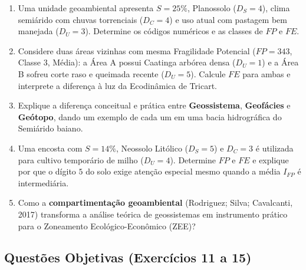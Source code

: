 \begin{enumerate}[leftmargin=1.8em, itemsep=4pt, resume]
  \item Uma unidade geoambiental apresenta $S = 25\%$, Planossolo ($D_S = 4$), clima semiárido com chuvas torrenciais ($D_C = 4$) e uso atual com pastagem bem manejada ($D_U = 3$). Determine os códigos numéricos e as classes de $FP$ e $FE$.
  \espacoResolucao[2.0cm]

  \item Considere duas áreas vizinhas com mesma Fragilidade Potencial ($FP = 343$, Classe 3, Média): a Área A possui Caatinga arbórea densa ($D_U = 1$) e a Área B sofreu corte raso e queimada recente ($D_U = 5$). Calcule $FE$ para ambas e interprete a diferença à luz da Ecodinâmica de Tricart.
  \espacoResolucao[2.2cm]

  \item Explique a diferença conceitual e prática entre \textbf{Geossistema}, \textbf{Geofácies} e \textbf{Geótopo}, dando um exemplo de cada um em uma bacia hidrográfica do Semiárido baiano.
  \espacoResolucao[2.0cm]

  \item Uma encosta com $S = 14\%$, Neossolo Litólico ($D_S = 5$) e $D_C = 3$ é utilizada para cultivo temporário de milho ($D_U = 4$). Determine $FP$ e $FE$ e explique por que o dígito $5$ do solo exige atenção especial mesmo quando a média $I_{FP}$ é intermediária.
  \espacoResolucao[2.0cm]

  \item Como a \textbf{compartimentação geoambiental} (Rodriguez; Silva; Cavalcanti, 2017) transforma a análise teórica de geossistemas em instrumento prático para o Zoneamento Ecológico-Econômico (ZEE)?
  \espacoResolucao[2.0cm]
\end{enumerate}

\subsection*{Questões Objetivas (Exercícios 11 a 15)}

